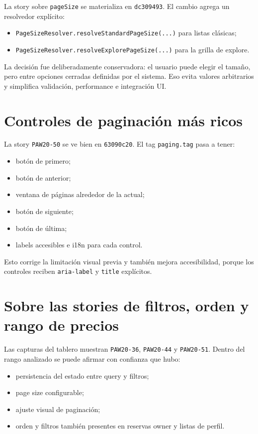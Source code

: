 \documentclass[11pt,a4paper]{report}
\newcommand{\commit}[1]{\texttt{#1}}
\newcommand{\code}[1]{\nolinkurl{#1}}
\newcommand{\story}[1]{\texttt{#1}}
\begin{document}
La story sobre \code{pageSize} se materializa en \commit{dc309493}. El cambio agrega un resolvedor expl\'icito:

\begin{itemize}
  \item \code{PageSizeResolver.resolveStandardPageSize(...)} para listas cl\'asicas;
  \item \code{PageSizeResolver.resolveExplorePageSize(...)} para la grilla de explore.
\end{itemize}

La decisi\'on fue deliberadamente conservadora: el usuario puede elegir el tama\~no, pero entre opciones cerradas definidas por el sistema. Eso evita valores arbitrarios y simplifica validaci\'on, performance e integraci\'on UI.

\section{Controles de paginaci\'on m\'as ricos}

La story \story{PAW20-50} se ve bien en \commit{63090c20}. El tag \code{paging.tag} pasa a tener:

\begin{itemize}
  \item bot\'on de primero;
  \item bot\'on de anterior;
  \item ventana de p\'aginas alrededor de la actual;
  \item bot\'on de siguiente;
  \item bot\'on de \'ultima;
  \item labels accesibles e i18n para cada control.
\end{itemize}

Esto corrige la limitaci\'on visual previa y tambi\'en mejora accesibilidad, porque los controles reciben \code{aria-label} y \code{title} expl\'icitos.

\section{Sobre las stories de filtros, orden y rango de precios}

Las capturas del tablero muestran \story{PAW20-36}, \story{PAW20-44} y \story{PAW20-51}. Dentro del rango analizado se puede afirmar con confianza que hubo:

\begin{itemize}
  \item persistencia del estado entre query y filtros;
  \item page size configurable;
  \item ajuste visual de paginaci\'on;
  \item orden y filtros tambi\'en presentes en reservas owner y listas de perfil.
\end{itemize}
\end{document}
